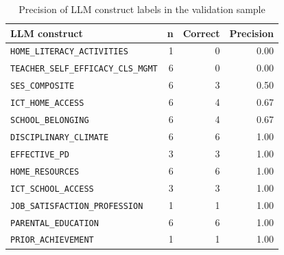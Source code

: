 \begin{table}[htbp]
\centering
\footnotesize
\caption{Precision of LLM construct labels in the validation sample}
\label{tab:C5}
\begin{tabular}{lrrr}
\toprule
LLM construct & n & Correct & Precision \\
\midrule
\texttt{HOME\_LITERACY\_ACTIVITIES} & 1 & 0 & 0.00 \\
\texttt{TEACHER\_SELF\_EFFICACY\_CLS\_MGMT} & 6 & 0 & 0.00 \\
\texttt{SES\_COMPOSITE} & 6 & 3 & 0.50 \\
\texttt{ICT\_HOME\_ACCESS} & 6 & 4 & 0.67 \\
\texttt{SCHOOL\_BELONGING} & 6 & 4 & 0.67 \\
\texttt{DISCIPLINARY\_CLIMATE} & 6 & 6 & 1.00 \\
\texttt{EFFECTIVE\_PD} & 3 & 3 & 1.00 \\
\texttt{HOME\_RESOURCES} & 6 & 6 & 1.00 \\
\texttt{ICT\_SCHOOL\_ACCESS} & 3 & 3 & 1.00 \\
\texttt{JOB\_SATISFACTION\_PROFESSION} & 1 & 1 & 1.00 \\
\texttt{PARENTAL\_EDUCATION} & 6 & 6 & 1.00 \\
\texttt{PRIOR\_ACHIEVEMENT} & 1 & 1 & 1.00 \\
\bottomrule
\end{tabular}

\end{table}

